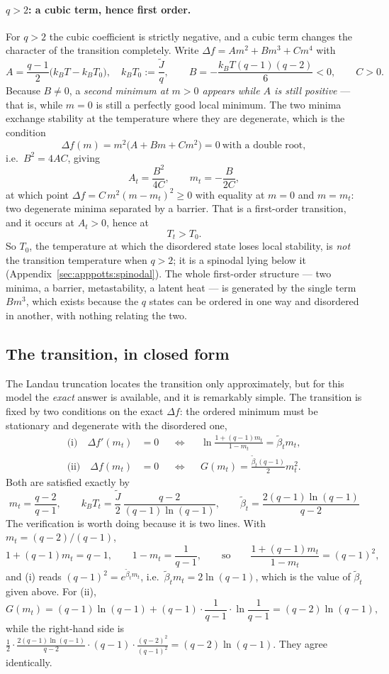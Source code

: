 \documentclass[10pt,a4paper]{article}
\theoremstyle{remark}
\begin{document}
\paragraph{$q>2$: a cubic term, hence first order.} For $q>2$ the cubic
coefficient is strictly negative, and a cubic term changes the character of the
transition completely. Write $\Delta f=Am^{2}+Bm^{3}+Cm^{4}$ with
\[
A=\frac{q-1}{2}\big(k_BT-k_BT_0\big),\quad
k_BT_0:=\frac{\tilde J}{q},\qquad
B=-\frac{k_BT(q-1)(q-2)}{6}<0,\qquad
C>0 .
\]
Because $B\neq0$, a \emph{second minimum at $m>0$ appears while $A$ is still
positive} --- that is, while $m=0$ is still a perfectly good local minimum. The
two minima exchange stability at the temperature where they are degenerate, which
is the condition
\[
\Delta f(m)=m^{2}\big(A+Bm+Cm^{2}\big)=0\ \text{with a double root},
\]
i.e.\ $B^{2}=4AC$, giving
\[
A_t=\frac{B^{2}}{4C},\qquad m_t=-\frac{B}{2C} ,
\]
at which point $\Delta f=C\,m^{2}(m-m_t)^{2}\geq0$ with equality at $m=0$ and
$m=m_t$: two degenerate minima separated by a barrier. That is a first-order
transition, and it occurs at $A_t>0$, hence at
\[
T_t>T_0 .
\]
So $T_0$, the temperature at which the disordered state loses local stability, is
\emph{not} the transition temperature when $q>2$; it is a spinodal lying below it
(Appendix~\ref{sec:apppotts:spinodal}). The whole first-order structure ---
two minima, a barrier, metastability, a latent heat --- is generated by the
single term $Bm^{3}$, which exists because the $q$ states can be ordered in one
way and disordered in another, with nothing relating the two.

\subsection{The transition, in closed form}
\label{sec:apppotts:transition}

The Landau truncation locates the transition only approximately, but for this
model the \emph{exact} answer is available, and it is remarkably simple. The
transition is fixed by two conditions on the exact $\Delta f$: the ordered
minimum must be stationary and degenerate with the disordered one,
\begin{align*}
\text{(i)}\quad \Delta f'(m_t)&=0
&&\Longleftrightarrow&&
\ln\frac{1+(q-1)m_t}{1-m_t}=\tilde\beta_t m_t ,\\
\text{(ii)}\quad \Delta f(m_t)&=0
&&\Longleftrightarrow&&
G(m_t)=\frac{\tilde\beta_t(q-1)}{2}m_t^{2} .
\end{align*}
Both are satisfied exactly by
\[
\;
m_t=\frac{q-2}{q-1},
\qquad
k_BT_t=\frac{\tilde J}{2}\,\frac{q-2}{(q-1)\ln(q-1)},
\qquad
\tilde\beta_t=\frac{2(q-1)\ln(q-1)}{q-2}\
\]
The verification is worth doing because it is two lines. With
$m_t=(q-2)/(q-1)$,
\[
1+(q-1)m_t=q-1,\qquad 1-m_t=\frac{1}{q-1},
\qquad\text{so}\qquad
\frac{1+(q-1)m_t}{1-m_t}=(q-1)^{2} ,
\]
and (i) reads $(q-1)^{2}=e^{\tilde\beta_tm_t}$, i.e.\
$\tilde\beta_tm_t=2\ln(q-1)$, which is the value of $\tilde\beta_t$ given above. For (ii),
\[
G(m_t)=(q-1)\ln(q-1)+(q-1)\cdot\frac{1}{q-1}\cdot\ln\frac{1}{q-1}
=(q-2)\ln(q-1) ,
\]
while the right-hand side is
$\tfrac12\cdot\tfrac{2(q-1)\ln(q-1)}{q-2}\cdot(q-1)\cdot\tfrac{(q-2)^{2}}{(q-1)^{2}}
=(q-2)\ln(q-1)$. They agree identically.
\end{document}
